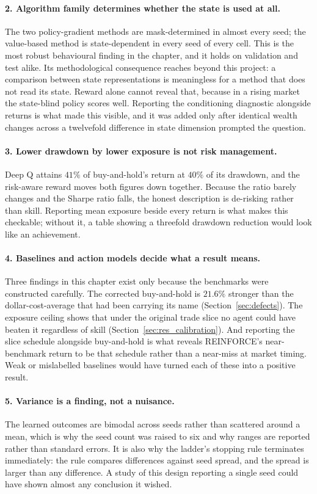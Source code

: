 \paragraph{2. Algorithm family determines whether the state is used at all.}
The two policy-gradient methods are mask-determined in almost every seed; the
value-based method is state-dependent in every seed of every cell. This is the
most robust behavioural finding in the chapter, and it holds on validation and
test alike. Its methodological consequence reaches beyond this project:
a comparison between state representations is meaningless for a method that does
not read its state. Reward alone cannot reveal that, because in a rising
market the state-blind policy scores well. Reporting the conditioning diagnostic
alongside returns is what made this visible, and it was added only after
identical wealth changes across a twelvefold difference in state dimension
prompted the question.

\paragraph{3. Lower drawdown by lower exposure is not risk management.} Deep Q
attains $41\%$ of buy-and-hold's return at $40\%$ of its drawdown, and the
risk-aware reward moves both figures down together. Because the ratio barely
changes and the Sharpe ratio falls, the honest description is de-risking rather
than skill. Reporting mean exposure beside every return is what makes this
checkable; without it, a table showing a threefold drawdown reduction would look
like an achievement.

\paragraph{4. Baselines and action models decide what a result means.} Three
findings in this chapter exist only because the benchmarks were constructed
carefully. The corrected buy-and-hold is $21.6\%$ stronger than the
dollar-cost-average that had been carrying its name
(Section~\ref{sec:defects}). The exposure ceiling shows that under the original
trade slice no agent could have beaten it regardless of skill
(Section~\ref{sec:res_calibration}). And reporting the slice schedule alongside
buy-and-hold is what reveals REINFORCE's near-benchmark return to be that
schedule rather than a near-miss at market timing. Weak or mislabelled baselines
would have turned each of these into a positive result.

\paragraph{5. Variance is a finding, not a nuisance.} The learned outcomes are
bimodal across seeds rather than scattered around a mean, which is why the seed
count was raised to six and why ranges are reported rather than standard errors.
It is also why the ladder's stopping rule terminates immediately: the rule
compares differences against seed spread, and the spread is larger than any
difference. A study of this design reporting a single seed could have shown
almost any conclusion it wished.


